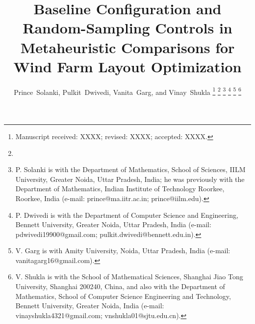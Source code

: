 \title{Baseline Configuration and Random-Sampling Controls in Metaheuristic Comparisons for Wind Farm Layout Optimization}
\author{Prince~Solanki, Pulkit~Dwivedi, Vanita~Garg, and Vinay~Shukla
\thanks{Manuscript received: XXXX; revised: XXXX; accepted: XXXX.}
\thanks{}
\thanks{P. Solanki  is with the Department of Mathematics, School of Sciences, IILM University, Greater Noida, Uttar Pradesh, India; he was previously with the Department of Mathematics, Indian Institute of Technology Roorkee, Roorkee, India (e-mail: prince@ma.iitr.ac.in; prince@iilm.edu).}
\thanks{P. Dwivedi is with the Department of Computer Science and Engineering, Bennett University, Greater Noida, Uttar Pradesh, India (e-mail: pdwivedi19900@gmail.com; pulkit.dwivedi@bennett.edu.in).}
\thanks{V. Garg is with Amity University, Noida, Uttar Pradesh, India (e-mail: vanitagarg16@gmail.com).}
\thanks{V. Shukla is with the School of Mathematical Sciences, Shanghai Jiao Tong University, Shanghai 200240, China, and also with the Department of Mathematics, School of Computer Science Engineering and Technology, Bennett University, Greater Noida, India (e-mail: vinayshukla4321@gmail.com; vnshukla01@sjtu.edu.cn).}}

\maketitle

